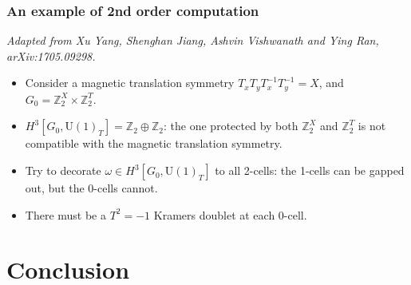 \documentclass[xcolor=table, 10pt, aspectratio=43]{beamer}
\newcommand{\uone}{\mathrm U(1)}
\begin{document}
\begin{frame}
\frametitle{An example of 2nd order computation}
\emph{\small Adapted from Xu Yang, Shenghan Jiang, Ashvin Vishwanath and Ying Ran, arXiv:1705.09298.}
\begin{itemize}
	\item Consider a magnetic translation symmetry $T_xT_yT_x^{-1}T_y^{-1} = X$, and $G_0=\mathbb Z_2^X\times\mathbb Z_2^T$.
	\item $H^3[G_0,\uone_T]=\mathbb Z_2\oplus\mathbb Z_2$: the one protected by both $\mathbb Z_2^X$ and $\mathbb Z_2^T$ is \alert{not compatible} with the magnetic translation symmetry.
	\item Try to decorate $\omega\in H^3[G_0,\uone_T]$ to all 2-cells: the 1-cells can be gapped out, but the 0-cells \alert{cannot}.
	\item There must be a $T^2=-1$ Kramers doublet at each 0-cell.
\end{itemize}
\begin{center}
\end{center}
\end{frame}

\section{Conclusion}
\end{document}
